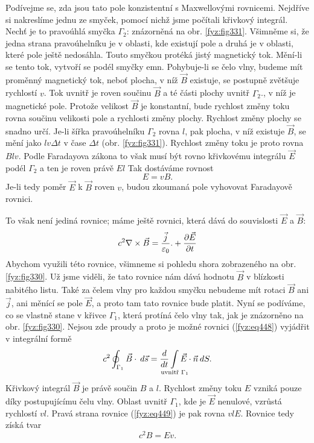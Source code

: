 {  Podívejme se, zda jsou tato pole konzistentní s Maxwellovými rovnicemi. Nejdříve si nakreslíme 
  jednu ze smyček, pomocí nichž jsme počítali křivkový integrál. Nechť je to pravoúhlá smyčka 
  \(\Gamma_2\): znázorněná na obr. \ref{fyz:fig331}. Všimněme si, že jedna strana pravoúhelníku je 
  v oblasti, kde existují pole a druhá je v oblasti, které pole ještě nedosáhla. Touto smyčkou 
  protéká jistý magnetický tok. Mění-li se tento tok, vytvoří se podél smyčky emn. Pohybuje-li se 
  čelo vlny, budeme mít proměnný magnetický tok, neboť plocha, v níž \(\vec{B}\) existuje, se 
  postupně zvětšuje rychlostí \(v\). Tok uvnitř je roven součinu \(\vec{B}\) a té části plochy 
  uvnitř \(\Gamma_2\)., v níž je magnetické pole. Protože velikost \(\vec{B}\) je konstantní, bude 
  rychlost změny toku rovna součinu velikosti pole a rychlosti změny plochy. Rychlost změny plochy 
  se snadno určí. Je-li šířka pravoúhelníku \(\Gamma_2\) rovna \(l\), pak plocha, v níž existuje 
  \(\vec{B}\), se mění jako \(lv\Delta t\) v čase \(\Delta t\) (obr. \ref{fyz:fig331}). Rychlost 
  změny toku je proto rovna \(Blv\). Podle Faradayova zákona to však musí být rovno křivkovému 
  integrálu \(\vec{E}\) podél \(\Gamma_2\) a ten je roven právě \(El\) Tak dostáváme rovnost
  \begin{equation}\label{fyz:eq447}
    E = vB.
  \end{equation}
  Je-li tedy poměr \(\vec{E}\) k \(\vec{B}\) roven \(v\), budou zkoumaná pole vyhovovat Faradayově 
  rovnici. 
  
  To však není jediná rovnice; máme ještě rovnici, která dává do souvislosti \(\vec{E}\) a 
  \(\vec{B}\):
  \begin{equation}\label{fyz:eq448}
    c^2\nabla\times\vec{B}  = \frac{\vec{j}}{\varepsilon_0}.+ \dfrac{\partial \vec{E}}{\partial t}
  \end{equation}
  Abychom využili této rovnice, všimneme si pohledu shora zobrazeného na obr. \ref{fyz:fig330}. Už 
  jsme viděli, že tato rovnice nám dává hodnotu \(\vec{B}\) v blízkosti nabitého listu. Také za 
  čelem vlny pro každou smyčku nebudeme mít rotaci \(\vec{B}\) ani \(\vec{j}\), ani měnící se pole 
  \(\vec{E}\), a proto tam tato rovnice bude platit. Nyní se podíváme, co se vlastně stane v křivce 
  \(\Gamma_1\), která protíná čelo vlny tak, jak je znázorněno na obr. \ref{fyz:fig330}. Nejsou zde 
  proudy a proto je možné rovnici (\ref{fyz:eq448}) vyjádřit v integrální formě
  \begin{equation}\label{fyz:eq449}
    c^2\oint_{\Gamma_1}\vec{B}\cdot\dd{\vec{s}}  = 
    \der{ }{t}\limitint_{\mathclap{\text{uvnitř }\Gamma_1}}\vec{E}\cdot\vec{n}\dd{S}.
  \end{equation}
  Křivkový integrál \(\vec{B}\) je právě součin \(B\) a \(l\). Rychlost změny toku \(E\) vzniká 
  pouze díky postupujícímu čelu vlny. Oblast uvnitř \(\Gamma_1\), kde je \(\vec{E}\) nenulové, 
  vzrůstá rychlostí \(vl\). Pravá strana rovnice (\ref{fyz:eq449}) je pak rovna \(vlE\). Rovnice 
  tedy získá tvar
  \begin{equation}\label{fyz:eq450}
    c^2B = Ev.
  \end{equation}

}
